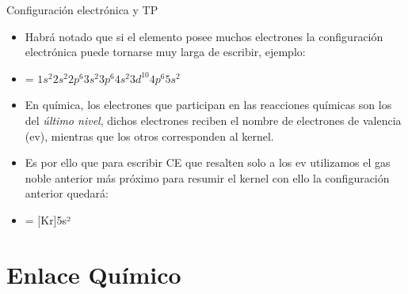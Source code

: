 \documentclass[11pt, aspectratio=169, xcolor=table]{beamer}
\begin{document}
\begin{frame}[label={sec:org7802e0d}]{Configuración electrónica y TP}
  \begin{itemize}
    \item Habrá notado que si el elemento posee muchos electrones la configuración electrónica puede tornarse muy larga de escribir, ejemplo:
    \item {} = $1s^2 2s^2 2p^6 3s^2 3p^6 4s^2 3d^{10} 4p^6 5s^2$
    \item En química, los electrones que participan en las reacciones químicas son los del \emph{último nivel}, dichos electrones reciben el nombre de \alert{electrones de valencia} (ev), mientras que los \guillemotleft{}otros\guillemotright{} corresponden al \guillemotleft{}kernel\guillemotright{}.
    \item Es por ello que para escribir CE que resalten solo a los ev utilizamos el gas noble anterior más próximo para resumir el \guillemotleft{}kernel\guillemotright{} con ello la configuración anterior quedará:
    \item {} = [Kr]5s²
  \end{itemize}
\end{frame}

\section{Enlace Químico}
\end{document}
